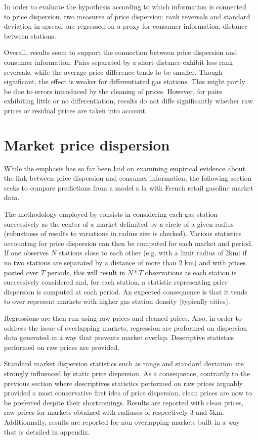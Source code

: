 \documentclass[english]{article}
\begin{document}
In order to evaluate the hypothesis according to which information is connected to price dispersion, two measures of price dispersion: rank reversals and standard deviation in spread, are regressed on a proxy for consumer information: distance between stations.

Overall, results seem to support the connection between price dispersion and consumer information. Pairs separated by a short distance exhibit less rank reversals, while the average price difference tends to be smaller. Though significant, the effect is weaker for differentiated gas stations. This might partly be due to errors introduced by the cleaning of prices. However, for pairs exhibiting little or no differentiation, results do not diffe significantly whether raw prices or residual prices are taken into account.

\section{Market price dispersion}

While the emphasis has so far been laid on examining empirical evidence about the link between price dispersion and consumer information, the following section seeks to compare predictions from a model a la \cite{VAR80} with French retail gasoline market data.

The methodology employed by \cite{TAP11} consists in considering each gas station successively as the center of a market delimited by a circle of a given radius (robustness of results to variations in radius size is checked). Various statistics accounting for price dispersion can then be computed for each market and period. If one observes $N$ stations close to each other (e.g. with a limit radius of 2km: if no two stations are separated by a distance of more than 2 km) and with prices posted over $T$ periods, this will result in $N*T$ observations as each station is successively considered and, for each station, a statistic representing price dispersion is computed at each period. An expected consequence is that it tends to over represent markets with higher gas station density (typically cities).

Regressions are then run using raw prices and cleaned prices. Also, in order to address the issue of overlapping markets, regression are performed on dispersion data generated in a way that prevents market overlap. Descriptive statistics performed on raw prices are provided.

Standard market dispersion statistics such as range and standard deviation are strongly influenced by static price dispersion. As a consequence, contrarily to the previous section where descriptives statistics performed on raw prices arguably provided a most conservative first idea of price dispersion, clean prices are now to be preferred despite their shortcomings. Results are reported with clean prices, raw prices for markets obtained with radiuses of respectively 3 and 5km. Additionnally, results are reported for non overlapping markets built in a way that is detailed in appendix.
\end{document}
